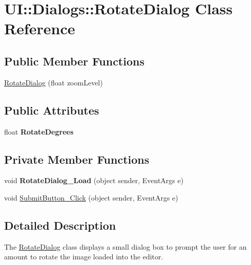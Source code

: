 \hypertarget{class_u_i_1_1_dialogs_1_1_rotate_dialog}{
\section{UI::Dialogs::RotateDialog Class Reference}
\label{class_u_i_1_1_dialogs_1_1_rotate_dialog}
}
\subsection*{Public Member Functions}
\begin{DoxyCompactItemize}
\item 
\hyperlink{class_u_i_1_1_dialogs_1_1_rotate_dialog_ab05642342ce614b274ba50ca34ae5d86}{RotateDialog} (float zoomLevel)
\end{DoxyCompactItemize}
\subsection*{Public Attributes}
\begin{DoxyCompactItemize}
\item 
\hypertarget{class_u_i_1_1_dialogs_1_1_rotate_dialog_a216921f32d9100796abc047e5ba54859}{
float {\bfseries RotateDegrees}}
\label{class_u_i_1_1_dialogs_1_1_rotate_dialog_a216921f32d9100796abc047e5ba54859}

\end{DoxyCompactItemize}
\subsection*{Private Member Functions}
\begin{DoxyCompactItemize}
\item 
\hypertarget{class_u_i_1_1_dialogs_1_1_rotate_dialog_ac57bd5cf0cfe7dac6f4ec7764cc969e3}{
void {\bfseries RotateDialog\_\-Load} (object sender, EventArgs e)}
\label{class_u_i_1_1_dialogs_1_1_rotate_dialog_ac57bd5cf0cfe7dac6f4ec7764cc969e3}

\item 
void \hyperlink{class_u_i_1_1_dialogs_1_1_rotate_dialog_ac08acd6e76a45ee3262ee27e126deea1}{SubmitButton\_\-Click} (object sender, EventArgs e)
\end{DoxyCompactItemize}


\subsection{Detailed Description}
The \hyperlink{class_u_i_1_1_dialogs_1_1_rotate_dialog}{RotateDialog} class displays a small dialog box to prompt the user for an amount to rotate the image loaded into the editor.


